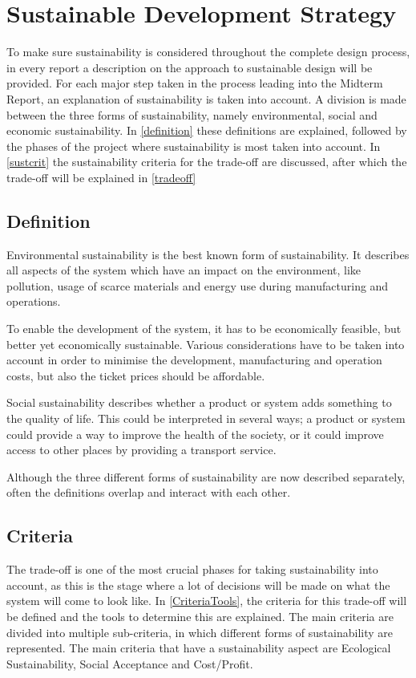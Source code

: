 \newpage
\chapter{Sustainable Development Strategy}
\label{ch-SDS}
To make sure sustainability is considered throughout the complete design process, in every report a description on the approach to sustainable design will be provided. For each major step taken in the process leading into the Midterm Report, an explanation of sustainability is taken into account. A division is made between the three forms of sustainability, namely environmental, social and economic sustainability. In \autoref{definition} these definitions are explained, followed by the phases of the project where sustainability is most taken into account. In \autoref{sustcrit} the sustainability criteria for the trade-off are discussed, after which the trade-off will be explained in \autoref{tradeoff}




\section{Definition}
\label{definition}
Environmental sustainability is the best known form of sustainability. It describes all aspects of the system which have an impact on the environment, like pollution, usage of scarce materials and energy use during manufacturing and operations.

To enable the development of the system, it has to be economically feasible, but better yet economically sustainable. Various considerations have to be taken into account in order to minimise the development, manufacturing and operation costs, but also the ticket prices should be affordable.

Social sustainability describes whether a product or system adds something to the quality of life. This could be interpreted in several ways; a product or system could provide a way to improve the health of the society, or it could improve access to other places by providing a transport service.

Although the three different forms of sustainability are now described separately, often the definitions overlap and interact with each other. 


\section{Criteria}
\label{sustcrit}
The trade-off is one of the most crucial phases for taking sustainability into account, as this is the stage where a lot of decisions will be made on what the system will come to look like. In \autoref{CriteriaTools}, the criteria for this trade-off will be defined and the tools to determine this are explained. The main criteria are divided into multiple sub-criteria, in which different forms of sustainability are represented. The main criteria that have a sustainability aspect are Ecological Sustainability, Social Acceptance and Cost/Profit. 

